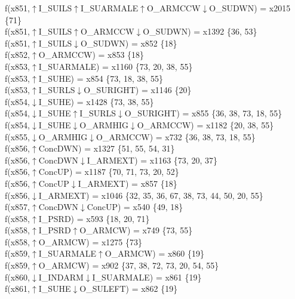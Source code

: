 f(x851,$\uparrow$I\_SUILS$\uparrow$I\_SUARMALE$\uparrow$O\_ARMCCW$\downarrow$O\_SUDWN) = x2015 \{71\} \\  
f(x851,$\uparrow$I\_SUILS$\uparrow$O\_ARMCCW$\downarrow$O\_SUDWN) = x1392 \{36, 53\} \\  
f(x851,$\uparrow$I\_SUILS$\downarrow$O\_SUDWN) = x852 \{18\} \\  
f(x852,$\uparrow$O\_ARMCCW) = x853 \{18\} \\  
f(x853,$\uparrow$I\_SUARMALE) = x1160 \{73, 20, 38, 55\} \\  
f(x853,$\uparrow$I\_SUHE) = x854 \{73, 18, 38, 55\} \\  
f(x853,$\uparrow$I\_SURLS$\downarrow$O\_SURIGHT) = x1146 \{20\} \\  
f(x854,$\downarrow$I\_SUHE) = x1428 \{73, 38, 55\} \\  
f(x854,$\downarrow$I\_SUHE$\uparrow$I\_SURLS$\downarrow$O\_SURIGHT) = x855 \{36, 38, 73, 18, 55\} \\  
f(x854,$\downarrow$I\_SUHE$\downarrow$O\_ARMHIG$\downarrow$O\_ARMCCW) = x1182 \{20, 38, 55\} \\  
f(x855,$\downarrow$O\_ARMHIG$\downarrow$O\_ARMCCW) = x732 \{36, 38, 73, 18, 55\} \\  
f(x856,$\uparrow$ConcDWN) = x1327 \{51, 55, 54, 31\} \\  
f(x856,$\uparrow$ConcDWN$\downarrow$I\_ARMEXT) = x1163 \{73, 20, 37\} \\  
f(x856,$\uparrow$ConcUP) = x1187 \{70, 71, 73, 20, 52\} \\  
f(x856,$\uparrow$ConcUP$\downarrow$I\_ARMEXT) = x857 \{18\} \\  
f(x856,$\downarrow$I\_ARMEXT) = x1046 \{32, 35, 36, 67, 38, 73, 44, 50, 20, 55\} \\  
f(x857,$\uparrow$ConcDWN$\downarrow$ConcUP) = x540 \{49, 18\} \\  
f(x858,$\uparrow$I\_PSRD) = x593 \{18, 20, 71\} \\  
f(x858,$\uparrow$I\_PSRD$\uparrow$O\_ARMCW) = x749 \{73, 55\} \\  
f(x858,$\uparrow$O\_ARMCW) = x1275 \{73\} \\  
f(x859,$\uparrow$I\_SUARMALE$\uparrow$O\_ARMCW) = x860 \{19\} \\  
f(x859,$\uparrow$O\_ARMCW) = x902 \{37, 38, 72, 73, 20, 54, 55\} \\  
f(x860,$\downarrow$I\_INDARM$\downarrow$I\_SUARMALE) = x861 \{19\} \\  
f(x861,$\uparrow$I\_SUHE$\downarrow$O\_SULEFT) = x862 \{19\} \\  

